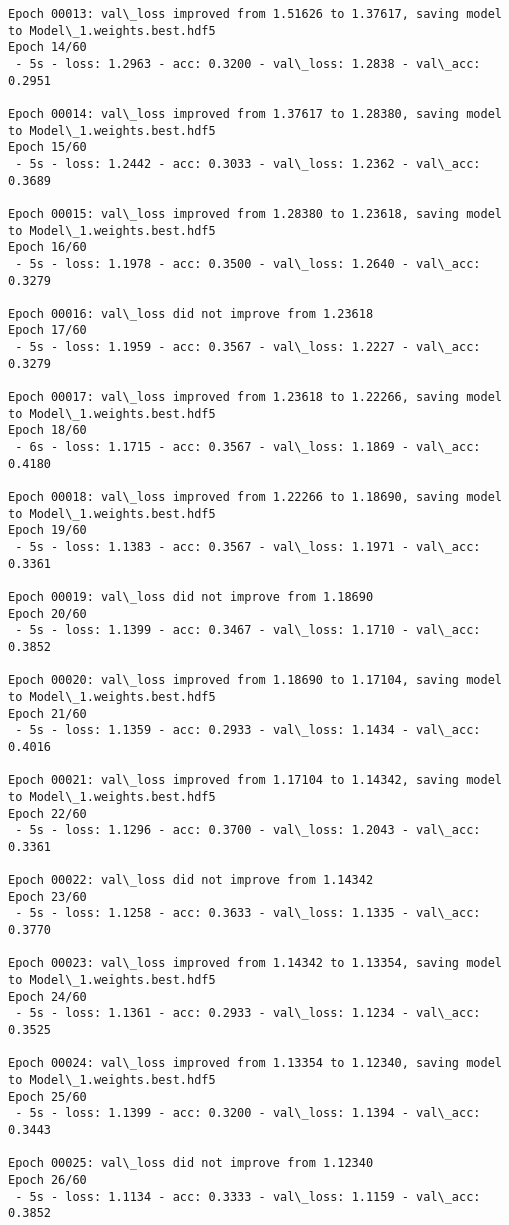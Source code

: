 \documentclass[11pt]{article}
\begin{document}
\begin{Verbatim}[commandchars=\\\{\}]
Epoch 00013: val\_loss improved from 1.51626 to 1.37617, saving model to Model\_1.weights.best.hdf5
Epoch 14/60
 - 5s - loss: 1.2963 - acc: 0.3200 - val\_loss: 1.2838 - val\_acc: 0.2951

Epoch 00014: val\_loss improved from 1.37617 to 1.28380, saving model to Model\_1.weights.best.hdf5
Epoch 15/60
 - 5s - loss: 1.2442 - acc: 0.3033 - val\_loss: 1.2362 - val\_acc: 0.3689

Epoch 00015: val\_loss improved from 1.28380 to 1.23618, saving model to Model\_1.weights.best.hdf5
Epoch 16/60
 - 5s - loss: 1.1978 - acc: 0.3500 - val\_loss: 1.2640 - val\_acc: 0.3279

Epoch 00016: val\_loss did not improve from 1.23618
Epoch 17/60
 - 5s - loss: 1.1959 - acc: 0.3567 - val\_loss: 1.2227 - val\_acc: 0.3279

Epoch 00017: val\_loss improved from 1.23618 to 1.22266, saving model to Model\_1.weights.best.hdf5
Epoch 18/60
 - 6s - loss: 1.1715 - acc: 0.3567 - val\_loss: 1.1869 - val\_acc: 0.4180

Epoch 00018: val\_loss improved from 1.22266 to 1.18690, saving model to Model\_1.weights.best.hdf5
Epoch 19/60
 - 5s - loss: 1.1383 - acc: 0.3567 - val\_loss: 1.1971 - val\_acc: 0.3361

Epoch 00019: val\_loss did not improve from 1.18690
Epoch 20/60
 - 5s - loss: 1.1399 - acc: 0.3467 - val\_loss: 1.1710 - val\_acc: 0.3852

Epoch 00020: val\_loss improved from 1.18690 to 1.17104, saving model to Model\_1.weights.best.hdf5
Epoch 21/60
 - 5s - loss: 1.1359 - acc: 0.2933 - val\_loss: 1.1434 - val\_acc: 0.4016

Epoch 00021: val\_loss improved from 1.17104 to 1.14342, saving model to Model\_1.weights.best.hdf5
Epoch 22/60
 - 5s - loss: 1.1296 - acc: 0.3700 - val\_loss: 1.2043 - val\_acc: 0.3361

Epoch 00022: val\_loss did not improve from 1.14342
Epoch 23/60
 - 5s - loss: 1.1258 - acc: 0.3633 - val\_loss: 1.1335 - val\_acc: 0.3770

Epoch 00023: val\_loss improved from 1.14342 to 1.13354, saving model to Model\_1.weights.best.hdf5
Epoch 24/60
 - 5s - loss: 1.1361 - acc: 0.2933 - val\_loss: 1.1234 - val\_acc: 0.3525

Epoch 00024: val\_loss improved from 1.13354 to 1.12340, saving model to Model\_1.weights.best.hdf5
Epoch 25/60
 - 5s - loss: 1.1399 - acc: 0.3200 - val\_loss: 1.1394 - val\_acc: 0.3443

Epoch 00025: val\_loss did not improve from 1.12340
Epoch 26/60
 - 5s - loss: 1.1134 - acc: 0.3333 - val\_loss: 1.1159 - val\_acc: 0.3852


\end{Verbatim}
\end{document}
